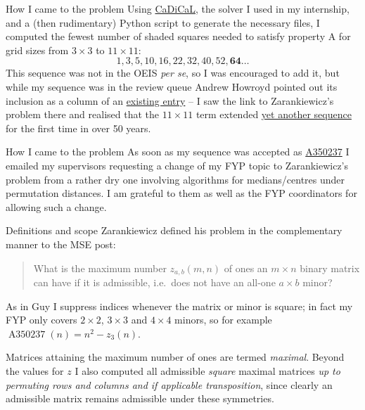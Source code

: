 \documentclass[10pt]{beamer}
\begin{document}
\begin{frame}{How I came to the problem}
  Using \href{https://github.com/arminbiere/cadical}{CaDiCaL}, the solver I used in my internship, and a (then rudimentary) Python script to generate the necessary files, I computed the fewest number of shaded squares needed to satisfy property A for grid sizes from $3\times3$ to $11\times11$:
  \begin{equation*}
      1,3,5,10,16,22,32,40,52,\mathbf{64}\dots
  \end{equation*}
  This sequence was not in the OEIS \textit{per se}, so I was encouraged to add it, but while my sequence was in the review queue Andrew Howroyd pointed out its inclusion as a column of an \href{https://oeis.org/A339635}{existing entry} -- I saw the link to Zarankiewicz's problem there and realised that the $11\times11$ term extended \href{https://oeis.org/A001198}{yet another sequence} for the first time in over 50 years.
\end{frame}

\begin{frame}{How I came to the problem}
  As soon as my sequence was accepted as \href{https://oeis.org/A350237}{A350237} I emailed my supervisors requesting a change of my FYP topic to Zarankiewicz's problem from a rather dry one involving algorithms for medians/centres under permutation distances. I am grateful to them as well as the FYP coordinators for allowing such a change.
\end{frame}

\begin{frame}{Definitions and scope}
  Zarankiewicz \cite{origin} defined his problem in the complementary manner to the MSE post:
  \begin{quote}
      What is the maximum number $z_{a,b}(m,n)$ of ones an $m\times n$ binary matrix can have if it is admissible, i.e.\ does not have an all-one $a\times b$ minor?
  \end{quote}
  As in Guy \cite{guy} I suppress indices whenever the matrix or minor is square; in fact my FYP only covers $2\times2$, $3\times3$ and $4\times4$ minors, so for example $\operatorname{A350237}(n)=n^2-z_3(n)$.
  
  Matrices attaining the maximum number of ones are termed \textit{maximal}. Beyond the values for $z$ I also computed all admissible \textit{square} maximal matrices \textit{up to permuting rows and columns and if applicable transposition}, since clearly an admissible matrix remains admissible under these symmetries.
\end{frame}
\end{document}
